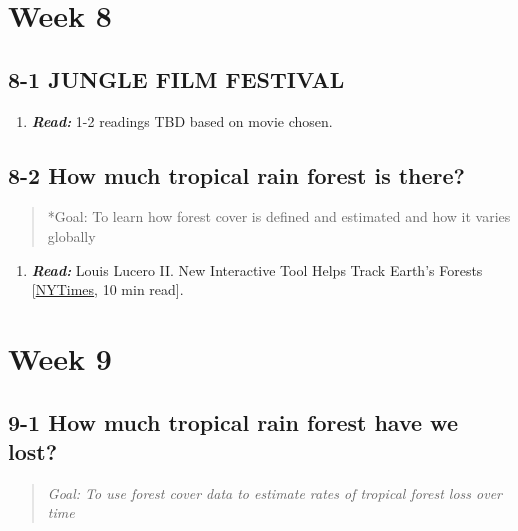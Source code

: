 \documentclass[
  10pt,
  letterpaper,
  oneside,
  open=any]{scrbook}
\providecommand{\tightlist}{%
  \setlength{\itemsep}{0pt}\setlength{\parskip}{0pt}}\usepackage{longtable,booktabs,array}
\begin{document}
\section{Week 8}\label{week-8}

\subsection*{8-1 JUNGLE FILM FESTIVAL}\label{jungle-film-festival}

\begin{enumerate}
\def\labelenumi{\arabic{enumi}.}
\tightlist
\item
  \textbf{\emph{Read:}} 1-2 readings TBD based on movie chosen.
\end{enumerate}

\subsection*{8-2 How much tropical rain forest is
there?}\label{how-much-tropical-rain-forest-is-there}

\begin{quote}
*Goal: To learn how forest cover is defined and estimated and how it
varies globally
\end{quote}

\begin{enumerate}
\def\labelenumi{\arabic{enumi}.}
\tightlist
\item
  \textbf{\emph{Read:}} Louis Lucero II. New Interactive Tool Helps
  Track Earth's Forests
  {[}\href{https://www.nytimes.com/2013/11/15/science/earth/new-interactive-tool-helps-track-earths-forests.html}{NYTimes},
  10 min read{]}.
\end{enumerate}

\section{Week 9}\label{week-9}

\subsection*{9-1 How much tropical rain forest have we
lost?}\label{how-much-tropical-rain-forest-have-we-lost}

\begin{quote}
\emph{Goal: To use forest cover data to estimate rates of tropical
forest loss over time}
\end{quote}
\end{document}
